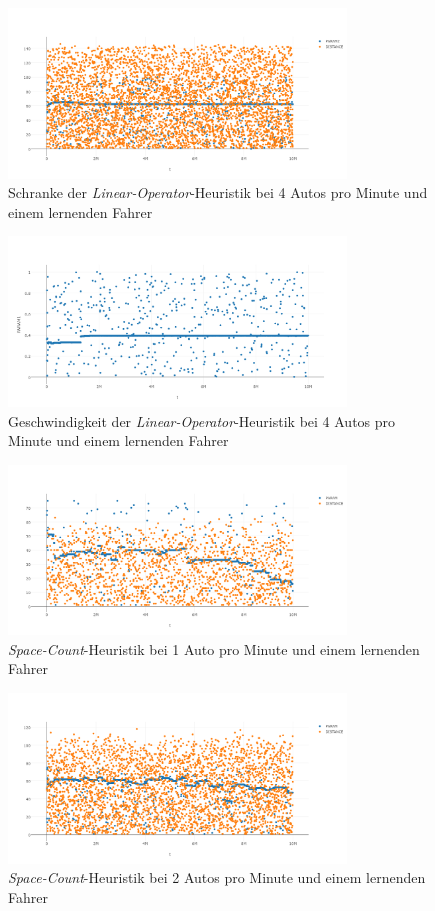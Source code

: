 \begin{figure}[H]
	\includegraphics[width=0.8\textwidth]{analyse/SingleMutant/linopzt4.png}
	\caption{Schranke der \emph{Linear-Operator}-Heuristik bei 4 Autos pro Minute und einem lernenden Fahrer}\label{fig:ap_sm_loz_4}
\end{figure}
\begin{figure}[H]
	\includegraphics[width=0.8\textwidth]{analyse/SingleMutant/linopa4.png}
	\caption{Geschwindigkeit der \emph{Linear-Operator}-Heuristik bei 4 Autos pro Minute und einem lernenden Fahrer}\label{fig:ap_sm_loa_4}
\end{figure}
\begin{figure}[H]
	\includegraphics[width=0.8\textwidth]{analyse/SingleMutant/spacecount1.png}
	\caption{\emph{Space-Count}-Heuristik bei 1 Auto pro Minute und einem lernenden Fahrer}\label{fig:ap_sm_sc_1}
\end{figure}
\begin{figure}[H]
	\includegraphics[width=0.8\textwidth]{analyse/SingleMutant/spacecount2.png}
	\caption{\emph{Space-Count}-Heuristik bei 2 Autos pro Minute und einem lernenden Fahrer}\label{fig:ap_sm_sc_2}
\end{figure}
